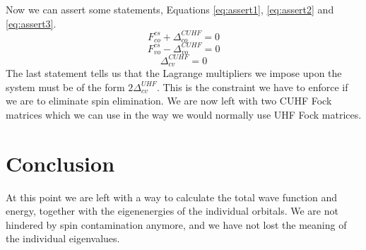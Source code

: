 \documentclass{article}
\begin{document}
Now we can assert some statements, Equations \eqref{eq:assert1}, \eqref{eq:assert2} and \eqref{eq:assert3}.
\begin{equation}\label{eq:assert1}
    F^{cs}_{co} + \Delta^{CUHF}_{co} = 0
\end{equation}
\begin{equation}\label{eq:assert2}
    F^{cs}_{vo} - \Delta^{CUHF}_{vo} = 0
\end{equation}
\begin{equation}\label{eq:assert3}
    \Delta^{CUHF}_{cv} = 0
\end{equation}
The last statement tells us that the Lagrange multipliers we impose upon the system must be of the form $2\Delta^{UHF}_{cv}$. This is the constraint we have to enforce if we are to 
eliminate spin elimination. We are now left with two CUHF Fock matrices which we can use in the way we would normally use UHF Fock matrices.

\section{Conclusion}
\label{sec:conc}
At this point we are left with a way to calculate the total wave function and energy, together with the eigenenergies of the individual orbitals. We are not hindered by spin 
contamination anymore, and we have not lost the meaning of the individual eigenvalues.  
\end{document}
